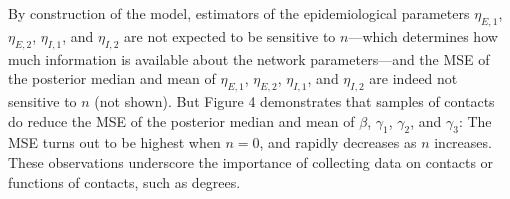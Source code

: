 By construction of the model,
estimators of the epidemiological parameters $\eta_{E,1}$, $\eta_{E,2}$, $\eta_{I,1}$, and $\eta_{I,2}$ are not expected to be sensitive to $n$---which determines how much information is available about the network parameters---and the MSE of the posterior median and mean of $\eta_{E,1}$, $\eta_{E,2}$, $\eta_{I,1}$, and $\eta_{I,2}$ are indeed not sensitive to $n$ (not shown).
But Figure 4 demonstrates that samples of contacts do reduce the MSE of the posterior median and mean of $\beta$, $\gamma_1$, $\gamma_2$, and $\gamma_3$:
The MSE turns out to be highest when $n = 0$,
and rapidly decreases as $n$ increases.
These observations underscore the importance of collecting data on contacts or functions of contacts,
such as degrees.
